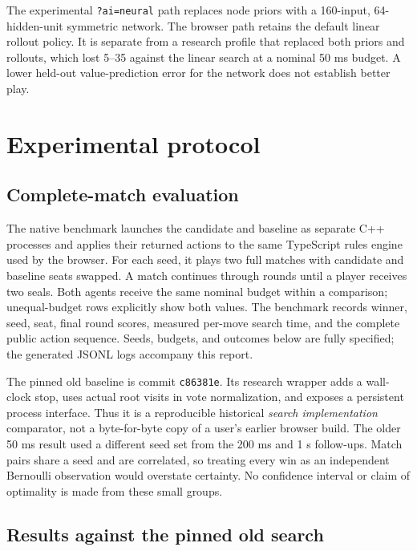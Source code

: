 \documentclass{article}
\newcommand{\code}[1]{\texttt{#1}}
\begin{document}
The experimental \code{?ai=neural} path replaces node priors with a 160-input, 64-hidden-unit symmetric network. The browser path retains the default linear rollout policy. It is separate from a research profile that replaced both priors and rollouts, which lost 5--35 against the linear search at a nominal 50 ms budget. A lower held-out value-prediction error for the network does not establish better play.

\section{Experimental protocol}

\subsection{Complete-match evaluation}

The native benchmark launches the candidate and baseline as separate C++ processes and applies their returned actions to the same TypeScript rules engine used by the browser. For each seed, it plays two full matches with candidate and baseline seats swapped. A match continues through rounds until a player receives two seals. Both agents receive the same nominal budget within a comparison; unequal-budget rows explicitly show both values. The benchmark records winner, seed, seat, final round scores, measured per-move search time, and the complete public action sequence. Seeds, budgets, and outcomes below are fully specified; the generated JSONL logs accompany this report.

The pinned old baseline is commit \code{c86381e}. Its research wrapper adds a wall-clock stop, uses actual root visits in vote normalization, and exposes a persistent process interface. Thus it is a reproducible historical \emph{search implementation} comparator, not a byte-for-byte copy of a user's earlier browser build. The older 50 ms result used a different seed set from the 200 ms and 1 s follow-ups. Match pairs share a seed and are correlated, so treating every win as an independent Bernoulli observation would overstate certainty. No confidence interval or claim of optimality is made from these small groups.

\subsection{Results against the pinned old search}
\end{document}

